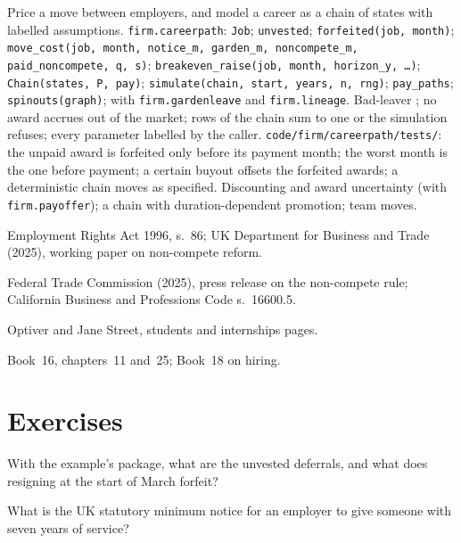 \begin{build}
 Price a move between employers, and model a career as a chain of states with labelled assumptions.
 \texttt{firm.careerpath}: \texttt{Job}; \texttt{unvested}; \texttt{forfeited(job, month)};
\texttt{move\_cost(job, month, notice\_m, garden\_m, noncompete\_m, paid\_noncompete, q, s)};
\texttt{breakeven\_raise(job, month, horizon\_y, \dots)}; \texttt{Chain(states, P, pay)}; \texttt{simulate(chain, start,
years, n, rng)}; \texttt{pay\_paths}; \texttt{spinouts(graph)}; with \texttt{firm.gardenleave} and \texttt{firm.lineage}.
 Bad-leaver ; no award accrues out of the market; rows of the chain sum to one or the simulation
refuses; every parameter labelled by the caller.
 \texttt{code/firm/careerpath/tests/}: the unpaid award is forfeited only before its payment
month; the worst month is the one before payment; a certain buyout offsets the forfeited awards; a deterministic chain
moves as specified.
 Discounting and award uncertainty (with \texttt{firm.payoffer}); a chain with duration-dependent
promotion; team moves.
\end{build}

\begin{omsources}
\item Employment Rights Act 1996, s.~86; UK Department for Business and Trade (2025), working paper on non-compete reform.
\item Federal Trade Commission (2025), press release on the non-compete rule; California Business and Professions Code
s.~16600.5.
\item Optiver and Jane Street, students and internships pages.
\item Book~16, chapters~11 and~25; Book~18 on hiring.
\end{omsources}

\section{Exercises}

\begin{exercise}[$\star$]\label{exo:in:career-paths-and-moves:1}
With the example's package, what are the unvested deferrals, and what does resigning at the start of March forfeit?
\end{exercise}

\begin{exercise}[$\star$]\label{exo:in:career-paths-and-moves:2}
What is the UK statutory minimum notice for an employer to give someone with seven years of service?
\end{exercise}

